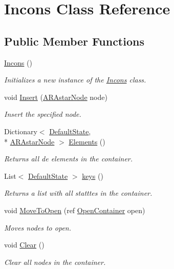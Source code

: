 \hypertarget{class_incons}{\section{Incons Class Reference}
\label{class_incons}
}
\subsection*{Public Member Functions}
\begin{DoxyCompactItemize}
\item 
\hyperlink{class_incons_a30350207d1df50ea95ea1a06f571a5fe}{Incons} ()
\begin{DoxyCompactList}\small\item\em Initializes a new instance of the \hyperlink{class_incons}{Incons} class. \end{DoxyCompactList}\item 
void \hyperlink{class_incons_a599de106ff55f34789e0d5140eabfe48}{Insert} (\hyperlink{class_a_r_astar_node}{A\-R\-Astar\-Node} node)
\begin{DoxyCompactList}\small\item\em Insert the specified node. \end{DoxyCompactList}\item 
Dictionary$<$ \hyperlink{class_default_state}{Default\-State}, \\*
\hyperlink{class_a_r_astar_node}{A\-R\-Astar\-Node} $>$ \hyperlink{class_incons_a728bdf34ed93795bcf20e77ff01ef23d}{Elements} ()
\begin{DoxyCompactList}\small\item\em Returns all de elements in the container. \end{DoxyCompactList}\item 
List$<$ \hyperlink{class_default_state}{Default\-State} $>$ \hyperlink{class_incons_af233952cd9fa9a2c7478bc02c29e3aad}{keys} ()
\begin{DoxyCompactList}\small\item\em Returns a list with all statttes in the container. \end{DoxyCompactList}\item 
void \hyperlink{class_incons_aa9e20464feb57c967621d58319d88f5e}{Move\-To\-Open} (ref \hyperlink{class_open_container}{Open\-Container} open)
\begin{DoxyCompactList}\small\item\em Moves nodes to open. \end{DoxyCompactList}\item 
void \hyperlink{class_incons_a50eda8dae76cbdc9d30e4ecef8645a8b}{Clear} ()
\begin{DoxyCompactList}\small\item\em Clear all nodes in the container. \end{DoxyCompactList}\end{DoxyCompactItemize}


